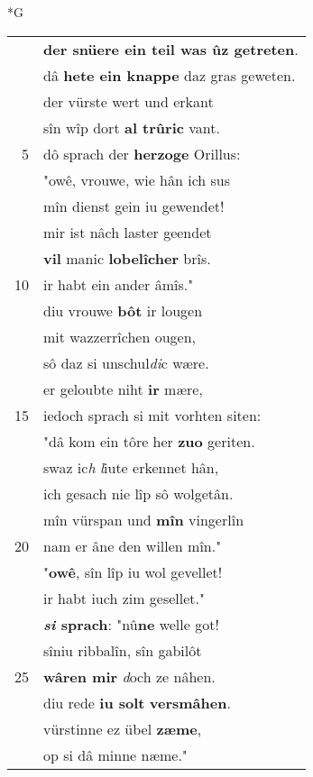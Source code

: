 \documentclass[8pt,a4paper,notitlepage]{article}
\begin{document}
\begin{table}[ht]
\begin{minipage}[t]{0.5\linewidth}
\small
\begin{center}*G
\end{center}
\begin{tabular}{rl}
 & \textbf{der snüere ein teil was ûz getreten}.\\ 
 & dâ \textbf{hete ein knappe} daz gras geweten.\\ 
 & der vürste wert und erkant\\ 
 & sîn wîp dort \textbf{al trûric} vant.\\ 
5 & dô sprach der \textbf{herzoge} Orillus:\\ 
 & "owê, vrouwe, wie hân ich sus\\ 
 & mîn dienst gein iu gewendet!\\ 
 & mir ist nâch laster geendet\\ 
 & \textbf{vil} manic \textbf{lobelîcher} brîs.\\ 
10 & ir habt ein ander âmîs."\\ 
 & diu vrouwe \textbf{bôt} ir lougen\\ 
 & mit wazzerrîchen ougen,\\ 
 & sô daz si unschul\textit{di}c wære.\\ 
 & er geloubte niht \textbf{ir} mære,\\ 
15 & iedoch sprach si mit vorhten siten:\\ 
 & "dâ kom ein tôre her \textbf{zuo} geriten.\\ 
 & swaz ic\textit{h} \textit{l}iute erkennet hân,\\ 
 & ich gesach nie lîp sô wolgetân.\\ 
 & mîn vürspan und \textbf{mîn} vingerlîn\\ 
20 & nam er âne den willen mîn."\\ 
 & "\textbf{owê}, sîn lîp iu wol gevellet!\\ 
 & ir habt iuch zim gesellet."\\ 
 & \textbf{\textit{si} sprach}: "nû\textbf{ne} welle got!\\ 
 & sîniu ribbalîn, sîn gabilôt\\ 
25 & \textbf{wâren mir} \textit{d}och ze nâhen.\\ 
 & diu rede \textbf{iu solt} \textbf{versmâhen}.\\ 
 & vürstinne ez übel \textbf{zæme},\\ 
 & op si dâ minne næme."\\ 

\end{tabular}
\end{minipage}
\end{table}
\end{document}
